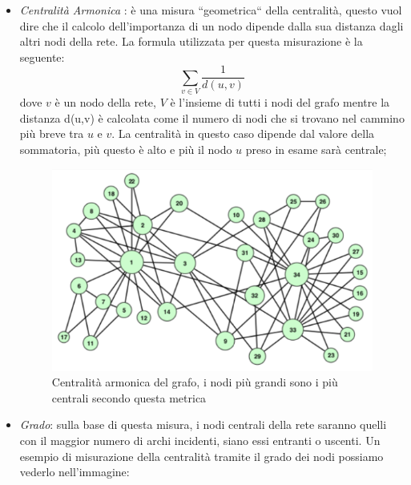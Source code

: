 \documentclass[12pt]{report}
\begin{document}
\begin{itemize}
    \item \textit{Centralità Armonica} \cite{Harmonic}:  è una misura ``geometrica`` della centralità, questo vuol dire che il calcolo dell'importanza di un nodo dipende dalla sua distanza dagli altri nodi della rete. 
    La formula utilizzata per questa misurazione è la seguente:
    \begin{equation}
    \sum_{v \in V} \frac{1}{d(u,v)}
    \end{equation}
    dove $v$ è un nodo della rete, $V$ è l'insieme di tutti i nodi del grafo mentre la distanza d(u,v) è calcolata come il numero di nodi che si trovano nel cammino più breve tra $u$ e $v$. La centralità in questo caso dipende dal valore della sommatoria, più questo è alto e più il nodo $u$ preso in esame sarà centrale;
 
    \begin{figure}[H]
        \centering
        \includegraphics[width=0.6\columnwidth]{Harmonic.png}
        \caption{Centralità armonica del grafo, i nodi più grandi sono i più centrali secondo questa metrica}
    \end{figure}

    \item \textit{Grado}: sulla base di questa misura, i nodi centrali della rete saranno quelli con il maggior numero di archi incidenti, siano essi entranti o uscenti.
    Un esempio di misurazione della centralità tramite il grado dei nodi possiamo vederlo nell'immagine:


\end{itemize}
\end{document}
